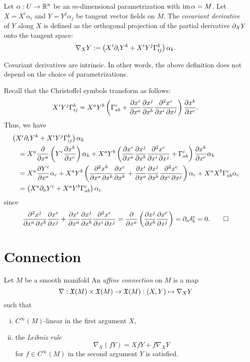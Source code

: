 \documentclass{../note}
\def\a{\alpha}
\begin{document}
\begin{defn}
Let $\a:U\to\R^n$ be an $m$-dimensional parametrization with $\im\a=M$.
Let $X=X^i\a_i$ and $Y=Y^j\a_j$ be tangent vector fields on $M$.
The \emph{covariant derivative} of $Y$ along $X$ is defined as the orthogonal projection of the partial derivative $\pd_XY$ onto the tangent space:
\[\nabla_XY:=\left(X^i\pd_iY^k+X^iY^j\Gamma_{ij}^k\right)\a_k.\]
\end{defn}

\begin{prop}
Covariant derivatives are intrinsic.
In other words, the above definition does not depend on the choice of parametrizations.
\end{prop}
\begin{pf}
Recall that the Christoffel symbols transform as follows:
\[X^iY^j\Gamma_{ij}^k=X^aY^b\left(\Gamma_{ab}^c+\pd{x^i}{x^a}\pd{x^j}{x^b}\pd[2]{x^c}{x^i}{x^j}\right)\pd{x^k}{x^c}.\]
Thus, we have
\begin{align*}
&\left(X^i\pd_iY^k+X^iY^j\Gamma_{ij}^k\right)\a_k\\
&\quad=X^a\pd{x^a}\left(Y^c\pd{x^k}{x^c}\right)\a_k+X^aY^b\left(\pd{x^i}{x^a}\pd{x^j}{x^b}\pd[2]{x^c}{x^i}{x^j}+\Gamma_{ab}^c\right)\pd{x^k}{x^c}\a_k\\
&\quad=X^a\pd{Y^c}{x^a}\a_c+X^aY^b\left(\pd[2]{x^k}{x^a}{x^b}\pd{x^c}{x^k}+\pd{x^i}{x^a}\pd{x^j}{x^b}\pd[2]{x^c}{x^i}{x^j}\right)\a_c+X^aX^b\Gamma_{ab}^c\a_c\\
&\quad=\left(X^a\pd_aY^c+X^aY^b\Gamma_{ab}^c\right)\a_c
\end{align*}
since
\[\pd[2]{x^j}{x^a}{x^b}\pd{x^c}{x^j}+\pd{x^i}{x^a}\pd{x^j}{x^b}\pd[2]{x^c}{x^i}{x^j}=\pd{x^a}\left(\pd{x^j}{x^b}\pd{x^c}{x^j}\right)=\pd_a\delta_b^c=0.\qedhere\]
\end{pf}



\section{Connection}

\begin{prb}
Let $M$ be a smooth manifold
An \emph{affine connection} on $M$ is a map
\[\nabla:\mathfrak{X}(M)\times\mathfrak{X}(M)\to\mathfrak{X}(M):(X,Y)\mapsto\nabla_XY\]
such that
\begin{enumerate}[(i)]
\item $C^\infty(M)$-linear in the first argument $X$,
\item the \emph{Leibniz rule}
\[\nabla_X(fY)=XfY+f\nabla_XY\]
for $f\in C^\infty(M)$ in the second argument $Y$ is satisfied.
\end{enumerate}
\end{prb}
\end{document}
